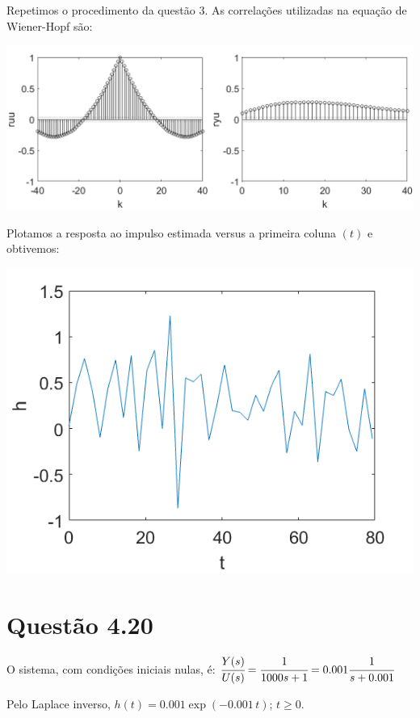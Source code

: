 \documentclass{rbfin}
\begin{document}
\newpage

Repetimos o procedimento da questão $3$. As correlações utilizadas na equação de Wiener-Hopf são:

\begin{center}
\includegraphics[scale=0.65]{4ruu}
\end{center}

Plotamos a resposta ao impulso estimada versus a primeira coluna $(t)$ e obtivemos:

\begin{center}
\includegraphics[scale=0.666]{4h}
\end{center}

\section*{Questão 4.20}

O sistema, com condições iniciais nulas, é: $\cfrac{Y(s)}{U(s)} = \cfrac{1}{1000s + 1} = 0.001 \cfrac{1}{s + 0.001}$

Pelo Laplace inverso, $h(t) = 0.001 \exp(- 0.001\,t)$; $t \ge 0$.
\end{document}
